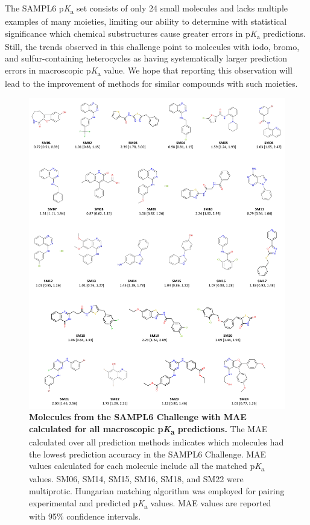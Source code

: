 \documentclass[9pt,lineno,final]{elife}
\newcommand{\pKa}{p\textit{K}\textsubscript{a}}
\begin{document}
The SAMPL6 \pKa{} set consists of only 24 small molecules and lacks multiple examples of many moieties, limiting our ability to determine with statistical significance which chemical substructures cause greater errors in \pKa{} predictions. 
Still, the trends observed in this challenge point to molecules with iodo, bromo, and sulfur-containing heterocycles as having systematically larger prediction errors in macroscopic \pKa{} value. 
We hope that reporting this observation will lead to the improvement of methods for similar compounds with such moieties. 


\begin{figure}
\begin{center}
\includegraphics[width=0.95\linewidth]{figures/molecules_with_MAE_of_all_methods.pdf}
\caption{{\bf Molecules from the SAMPL6 Challenge with MAE calculated for all macroscopic \pKa{} predictions.} 
The MAE calculated over all prediction methods indicates which molecules had the lowest prediction accuracy in the SAMPL6 Challenge. 
MAE values calculated for each molecule include all the matched \pKa{} values. 
SM06, SM14, SM15, SM16, SM18, and SM22 were multiprotic. 
Hungarian matching algorithm was employed for pairing experimental and predicted \pKa{} values. 
MAE values are reported with 95\% confidence intervals.
}
\label{fig:molecules_with_MAE_of_all_methods}
\end{center}
\end{figure}
\end{document}
